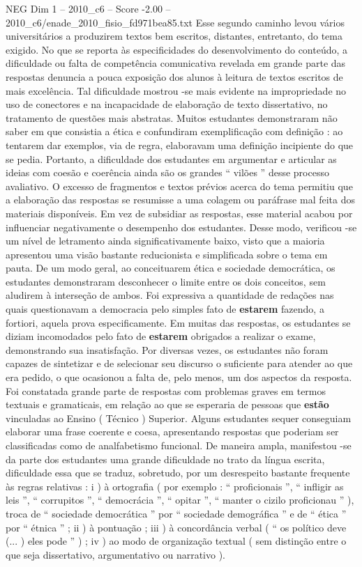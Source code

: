 \begin{textsample}{NEG Dim 1 – 2010\_c6 – Score -2.00 – 2010\_c6/enade\_2010\_fisio\_fd971bea85.txt}
Esse segundo caminho levou vários universitários a produzirem textos bem escritos, distantes, entretanto, do tema exigido.
No que se reporta às especificidades do desenvolvimento do conteúdo, a dificuldade ou falta de competência comunicativa revelada em grande parte das respostas denuncia a pouca exposição dos alunos à leitura de textos escritos de mais excelência.
Tal dificuldade mostrou -se mais evidente na impropriedade no uso de conectores e na incapacidade de elaboração de texto dissertativo, no tratamento de questões mais abstratas.
Muitos estudantes demonstraram não saber em que consistia a ética e confundiram exemplificação com definição : ao tentarem dar exemplos, via de regra, elaboravam uma definição incipiente do que se pedia.
Portanto, a dificuldade dos estudantes em argumentar e articular as ideias com coesão e coerência ainda são os grandes “ vilões ” desse processo avaliativo.
O excesso de fragmentos e textos prévios acerca do tema permitiu que a elaboração das respostas se resumisse a uma colagem ou paráfrase mal feita dos materiais disponíveis.
Em vez de subsidiar as respostas, esse material acabou por influenciar negativamente o desempenho dos estudantes.
Desse modo, verificou -se um nível de letramento ainda significativamente baixo, visto que a maioria apresentou uma visão bastante reducionista e simplificada sobre o tema em pauta.
De um modo geral, ao conceituarem ética e sociedade democrática, os estudantes demonstraram desconhecer o limite entre os dois conceitos, sem aludirem à interseção de ambos.
Foi expressiva a quantidade de redações nas quais questionavam a democracia pelo simples fato de \textbf{estarem} fazendo, a fortiori, aquela prova especificamente.
Em muitas das respostas, os estudantes se diziam incomodados pelo fato de \textbf{estarem} obrigados a realizar o exame, demonstrando sua insatisfação.
Por diversas vezes, os estudantes não foram capazes de sintetizar e de selecionar seu discurso o suficiente para atender ao que era pedido, o que ocasionou a falta de, pelo menos, um dos aspectos da resposta.
Foi constatada grande parte de respostas com problemas graves em termos textuais e gramaticais, em relação ao que se esperaria de pessoas que \textbf{estão} vinculadas ao Ensino ( Técnico ) Superior.
Alguns estudantes sequer conseguiam elaborar uma frase coerente e coesa, apresentando respostas que poderiam ser classificadas como de analfabetismo funcional.
De maneira ampla, manifestou -se da parte dos estudantes uma grande dificuldade no trato da língua escrita, dificuldade essa que se traduz, sobretudo, por um desrespeito bastante frequente às regras relativas : i ) à ortografia ( por exemplo : “ proficionais ”, “ infligir as leis ”, “ corrupitos ”, “ democrácia ”, “ opitar ”, “ manter o cizilo proficionau ” ), troca de “ sociedade democrática ” por “ sociedade demográfica ” e de “ ética ” por “ étnica ” ; ii ) à pontuação ; iii ) à concordância verbal ( “ os político deve (... ) eles pode ” ) ; iv ) ao modo de organização textual ( sem distinção entre o que seja dissertativo, argumentativo ou narrativo ).

\end{textsample}
